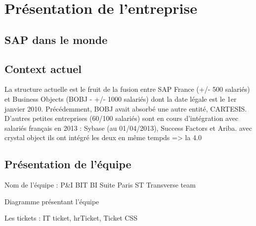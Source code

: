 \chapter{Pr\'{e}sentation de l'entreprise}
\section{SAP dans le monde}

\section{Context actuel}
La structure actuelle est le fruit de la fusion entre SAP France (+/- 500 salari\'{e}s) et Business Objects (BOBJ - +/- 1000 salari\'{e}s) dont la date l\'{e}gale est le 1er janvier 2010. Pr\'{e}c\'{e}demment, BOBJ avait absorb\'{e} une autre entit\'{e}, CARTESIS. D'autres petites entreprises (60/100 salari\'{e}s) sont en cours d'int\'{e}gration avec salari\'{e}s fran\c{c}ais en 2013 : Sybase (au 01/04/2013), Success Factors et Ariba.
 avec crystal object
ils ont intégré les deux en même tempds  => la 4.0

\section{Pr\'{e}sentation de l'\'{e}quipe}
Nom de l'\'{e}quipe : P\&I BIT BI Suite Paris ST Transverse team

Diagramme pr\'{e}sentant l'\'{e}quipe


Les tickets : IT ticket, hrTicket, Ticket CSS

